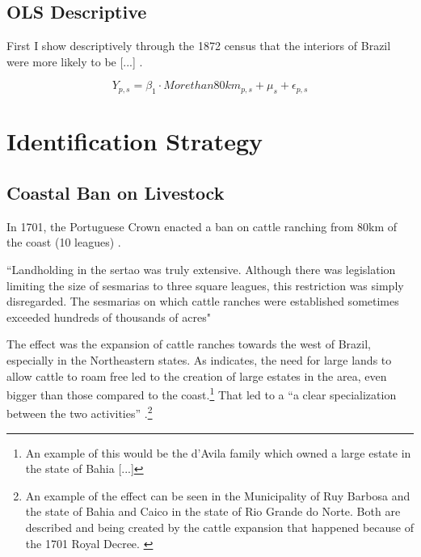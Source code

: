 \documentclass{article}
\begin{document}
\subsection{OLS Descriptive}

First I show descriptively through the 1872 census that the interiors of Brazil were more likely to be [...] \parencite{Laudares2022-vy}.

\begin{equation}
  Y_{p,s} = \beta_1 \cdot Morethan80km_{p,s} + \mu_s + \epsilon_{p,s}
\end{equation}

\section{Identification Strategy}

\subsection{Coastal Ban on Livestock}

In 1701, the Portuguese Crown enacted a ban on cattle ranching from 80km of the coast (10 leagues) \parencites[p~.40]{Fausto2014-bh}[p~.198]{Simonsen2005-ps}[p~.460]{Bethell1984-of}.

\textcite{Bethell1984-of} ``Landholding in the sertao was truly extensive. Although there was legislation limiting the size of sesmarias to three square leagues, this restriction was simply disregarded. The sesmarias on which cattle ranches were established sometimes exceeded hundreds of thousands of acres"

The effect was the expansion of cattle ranches towards the west of Brazil, especially in the Northeastern states. 
As \textcite[p~.41]{Fausto2014-bh} indicates, the need for large lands to allow cattle to roam free led to the creation of large estates in the area, even bigger than those compared to the coast.\footnote{An example of this would be the d'Avila family which owned a large estate in the state of Bahia [...]}
That led to a ``a clear specialization between the two activities'' \parencite{Ribeiro2012-lb}.\footnote{An example of the effect can be seen in the Municipality of Ruy Barbosa and the state of Bahia and Caico in the state of Rio Grande do Norte. Both are described and being created by the cattle expansion that happened because of the 1701 Royal Decree. \parencite{UnknownUnknown-ro}}

\parencite[p~.]{Boxer1962-bj}
\end{document}
